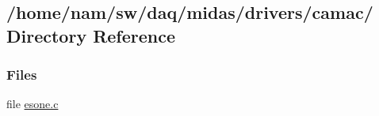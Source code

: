 \subsection{/home/nam/sw/daq/midas/drivers/camac/ Directory Reference}
\label{dir_ccf2f27fc10a840a0860d6cbd702cf69}
\subsubsection*{Files}
\begin{DoxyCompactItemize}
\item 
file \hyperlink{esone_8c}{esone.c}
\end{DoxyCompactItemize}
